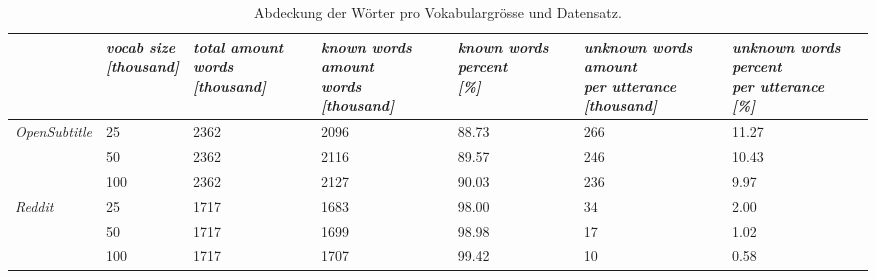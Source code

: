 \begin{table}[H]
	\begin{adjustbox}{max width=\textwidth}
		\centering
		\small
		\begin{tabular}{lllllll}
			\toprule
			&  \specialcell{\emph{vocab size}	\\\textit{[thousand]}}
			&  \specialcell{\emph{total amount words}	\\\textit{[thousand]}}
			&  \specialcell{\emph{known words amount}\\\emph{words} \\\textit{[thousand]}}
			&  \specialcell{\emph{known words percent} \\\textit{[\%]}}
			&  \specialcell{\emph{unknown words amount}\\\emph{per utterance} \\\textit{[thousand]}}
			&  \specialcell{\emph{unknown words percent}\\\emph{per utterance} \\\textit{[\%]}}\\
			\midrule
			\emph{OpenSubtitle}	&25		&2362	&2096	&88.73	&266	&11.27\\
								&50		&2362	&2116	&89.57	&246	&10.43\\
								&100	&2362	&2127	&90.03	&236	&9.97\\
			\emph{Reddit}		&25		&1717	&1683	&98.00	&34		&2.00\\
								&50		&1717	&1699	&98.98	&17		&1.02\\
								&100	&1717	&1707	&99.42	&10		&0.58\\
			\bottomrule
		\end{tabular}
	\end{adjustbox}
	\caption{Abdeckung der Wörter pro Vokabulargrösse und Datensatz.}
	\label{tbl:data:split:corpus:analyze}
\end{table}

